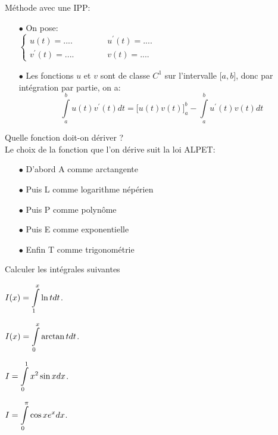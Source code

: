 \documentclass[a4paper, 11pt]{article}
\begin{document}
{{{\begin{dboxminipage}{14cm}
	\vsec
	M\'ethode avec une IPP:
	\begin{itemize}
		\item[$\bullet$] On pose: \\ $\left\lbrace\begin{array}{lll}
				      u(t)=....          & \hspace{1cm} & u^{\prime}(t)=.... \\
				      v^{\prime}(t)=.... & \hspace{1cm} & v(t)=....
			      \end{array}\right.$
		\item[$\bullet$] Les fonctions  $u$ et $v$ sont de classe $C^1$ sur l'intervalle $\lbrack a,b\rbrack$,
		      donc par int\'egration par partie, on a:
		      $$\int\limits_{a}^b u(t)v^{\prime}(t)dt= \lbrack u(t)v(t)\rbrack_a^b -\int\limits_a^b u^{\prime}(t)v(t)dt$$
	\end{itemize}
\end{dboxminipage}
\vsec \vsec







Quelle fonction doit-on d\'eriver ?\\
Le choix de la fonction que l'on d\'erive suit la loi ALPET:
\begin{itemize}
	\item[$\bullet$] D'abord A comme arctangente
	\item[$\bullet$] Puis L comme logarithme n\'ep\'erien
	\item[$\bullet$] Puis P comme polyn\^ome
	\item[$\bullet$] Puis E comme exponentielle
	\item[$\bullet$] Enfin T comme trigonom\'etrie
\end{itemize}



{\footnotesize \begin{exo}
	Calculer les intégrales suivantes
	\begin{enumerate}
		\begin{minipage}[t]{0.48\textwidth}
			\item $I(x)=\displaystyle\int\limits_1^x \ln{t}dt$.\\
			\item $I(x)=\displaystyle\int\limits_0^x \arctan{t}dt$.
		\end{minipage}
		\begin{minipage}[t]{0.48\textwidth}
			\item $I=\displaystyle\int\limits_0^1 x^2\sin{x}dx $.\\
			\item $I=\displaystyle\int\limits_0^{\pi} \cos{x} e^x dx$.
		\end{minipage}
	\end{enumerate}
\end{exo}}
\vsec

}}}
\end{document}
